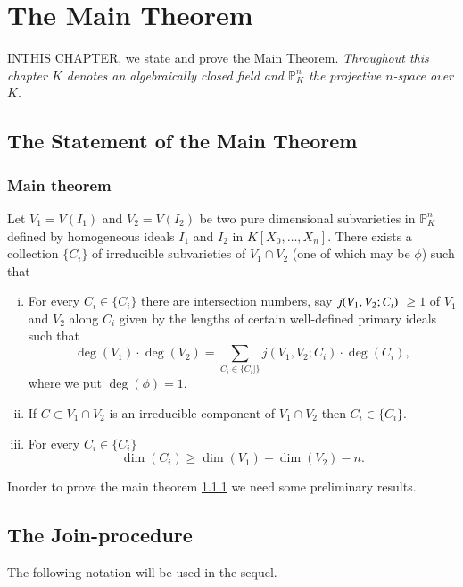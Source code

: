 \chapter{The Main Theorem}\label{chap2}

IN\pageoriginale THIS CHAPTER,  we state and prove the Main Theorem. \textit
{Throughout this chapter $K$ denotes an algebraically closed field and
  $\mathbb{P}^n_K$ the projective $n$-space over $K$}. 

\section{The Statement of the Main Theorem}\label{chap2:sec1}%

\subsection{Main theorem}\label{chap2:sec1:subsec2.1}%

Let $V_1 = V(I_1) $ and $V_2 = V(I_2)$ be two pure dimensional
  subvarieties in $\mathbb{P}^n_K$ defined by homogeneous  ideals
  $I_1$ and $I_2$ in $K[X_0, \ldots,  X_n]$. There exists a collection
  $\{C_i\}$ of irreducible subvarieties of $V_1 \cap V_2$ (one of which
  may be $\phi$) such that 
\begin{enumerate}[(i)]
\item  For every $C_i \in \{ C_i \}$ there are intersection
  numbers, say $j(V_1,\break V_2; C_i)$ $\ge 1$ of $V_1$ and $V_2$ along $C_i$
  given by the lengths of certain well-defined primary ideals such
  that
  $$
  \deg (V_1)\cdot \deg (V_2) = \sum_{C_i \in \{ C_i ]\}} j(V_1,
  V_2; C_i)\cdot \deg (C_i), 
  $$
  where we put $\deg (\phi) = 1$.
\item  If $C \subset V_1 \cap V_2$ is an irreducible component of $V_1
  \cap V_2$ then $C_i \in  \{ C_i\}$. 
\item For every $C_i \in  \{ C_i \}$
  $$
  \dim (C_i) \ge \dim (V_1) + \dim (V_2) - n.
  $$
\end{enumerate}

In\pageoriginale order to prove the main theorem
\ref{chap2:sec1:subsec2.1} we need some preliminary results. 

\section{The Join-procedure}\label{chap2:sec2}%

The following notation will be used in the sequel.  

